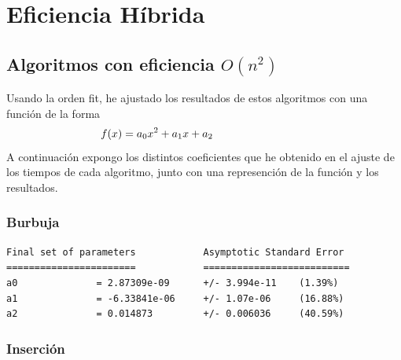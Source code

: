 \documentclass[a4]{article}
\begin{document}
\section{Eficiencia Híbrida}

\subsection{Algoritmos con eficiencia $O(n^2)$}

\begin{flushleft}
  Usando la orden fit, he ajustado los resultados de estos algoritmos
  con una función de la forma \[\hspace{-30mm}f(x)=a_0x^2+a_1x+a_2\] A
  continuación expongo los distintos coeficientes que he obtenido en
  el ajuste de los tiempos de cada algoritmo, junto con una
  represención de la función y los resultados.
\end{flushleft}

\subsubsection{Burbuja}

\begin{verbatim}
Final set of parameters            Asymptotic Standard Error
=======================            ==========================
a0              = 2.87309e-09      +/- 3.994e-11    (1.39%)
a1              = -6.33841e-06     +/- 1.07e-06     (16.88%)
a2              = 0.014873         +/- 0.006036     (40.59%)
\end{verbatim}

\begin{figure}[H]
  \centering
\end{figure}

\subsubsection{Inserción}
\end{document}
